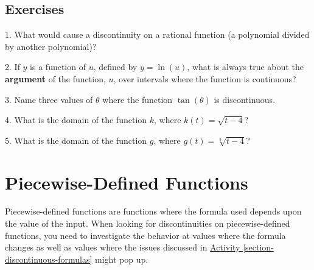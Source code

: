 \documentclass[12pt,]{book}
\newcommand{\terminology}[1]{\textbf{#1}}
\theoremstyle{plain}
\theoremstyle{definition}
\numberwithin{equation}{section}
\newcommand{\fe}[2]{#1\mathopen{}\left(#2\right)\mathclose{}}
\begin{document}
\subsection[Exercises]{Exercises}\label{exercises-16}
\begin{exerciselist}
\item[1.]\hypertarget{exercise-124}{\null}What would cause a discontinuity on a rational function (a polynomial divided by another polynomial)?%
\par\smallskip
\item[2.]\hypertarget{exercise-125}{\null}If \(y\) is a function of \(u\), defined by \(y=\fe{\ln}{u}\), what is always true about the \terminology{argument} of the function, \(u\), over intervals where the function is continuous?%
\par\smallskip
\item[3.]\hypertarget{exercise-126}{\null}Name three values of \(\theta\) where the function \(\fe{\tan}{\theta}\) is discontinuous.%
\par\smallskip
\item[4.]\hypertarget{exercise-127}{\null}What is the domain of the function \(k\), where \(\fe{k}{t}=\sqrt{t-4}\)?%
\par\smallskip
\item[5.]\hypertarget{exercise-128}{\null}What is the domain of the function \(g\), where \(\fe{g}{t}=\sqrt[3]{t-4}\)?%
\par\smallskip
\end{exerciselist}
\typeout{************************************************}
\typeout{************************************************}
\section[Piecewise-Defined Functions]{Piecewise-Defined Functions}\label{section-piecewise-defined-functions}
Piecewise-defined functions are functions where the formula used depends upon the value of the input. When looking for discontinuities on piecewise-defined functions, you need to investigate the behavior at values where the formula changes as well as values where the issues discussed in \hyperref[section-discontinuous-formulas]{Activity \ref{section-discontinuous-formulas}} might pop up.%
\typeout{************************************************}
\typeout{************************************************}
\end{document}
